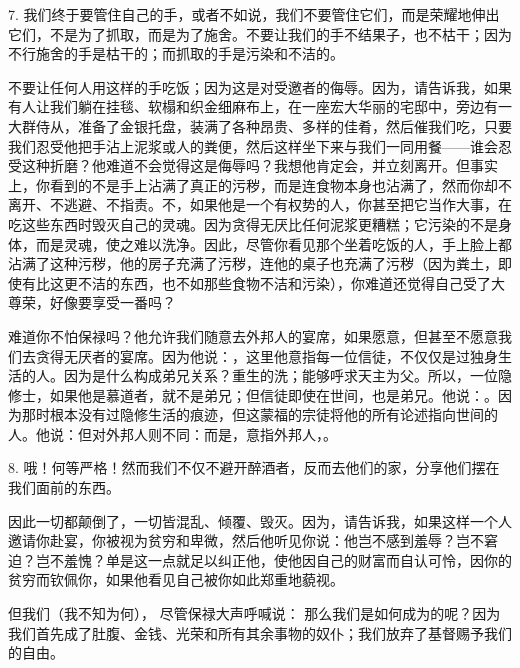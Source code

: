 7. 我们终于要管住自己的手，或者不如说，我们不要管住它们，而是荣耀地伸出它们，不是为了抓取，而是为了施舍。不要让我们的手不结果子，也不枯干；因为不行施舍的手是枯干的；而抓取的手是污染和不洁的。\par

不要让任何人用这样的手吃饭；因为这是对受邀者的侮辱。因为，请告诉我，如果有人让我们躺在挂毯、软榻和织金细麻布上，在一座宏大华丽的宅邸中，旁边有一大群侍从，准备了金银托盘，装满了各种昂贵、多样的佳肴，然后催我们吃，只要我们忍受他把手沾上泥浆或人的粪便，然后这样坐下来与我们一同用餐——谁会忍受这种折磨？他难道不会觉得这是侮辱吗？我想他肯定会，并立刻离开。但事实上，你看到的不是手上沾满了真正的污秽，而是连食物本身也沾满了，然而你却不离开、不逃避、不指责。不，如果他是一个有权势的人，你甚至把它当作大事，在吃这些东西时毁灭自己的灵魂。因为贪得无厌比任何泥浆更糟糕；它污染的不是身体，而是灵魂，使之难以洗净。因此，尽管你看见那个坐着吃饭的人，手上脸上都沾满了这种污秽，他的房子充满了污秽，连他的桌子也充满了污秽（因为粪土，即使有比这更不洁的东西，也不如那些食物不洁和污染），你难道还觉得自己受了大尊荣，好像要享受一番吗？\par

难道你不怕保禄吗？他允许我们随意去外邦人的宴席，如果愿意，但甚至不愿意我们去贪得无厌者的宴席。因为他说：，这里他意指每一位信徒，不仅仅是过独身生活的人。因为是什么构成弟兄关系？重生的洗；能够呼求天主为父。所以，一位隐修士，如果他是慕道者，就不是弟兄；但信徒即使在世间，也是弟兄。他说：。因为那时根本没有过隐修生活的痕迹，但这蒙福的宗徒将他的所有论述指向世间的人。他说：但对外邦人则不同：而是，意指外邦人，。\par

8. 哦！何等严格！然而我们不仅不避开醉酒者，反而去他们的家，分享他们摆在我们面前的东西。\par

因此一切都颠倒了，一切皆混乱、倾覆、毁灭。因为，请告诉我，如果这样一个人邀请你赴宴，你被视为贫穷和卑微，然后他听见你说：他岂不感到羞辱？岂不窘迫？岂不羞愧？单是这一点就足以纠正他，使他因自己的财富而自认可怜，因你的贫穷而钦佩你，如果他看见自己被你如此郑重地藐视。\par

但我们（我不知为何）， 尽管保禄大声呼喊说： 那么我们是如何成为的呢？因为我们首先成了肚腹、金钱、光荣和所有其余事物的奴仆；我们放弃了基督赐予我们的自由。\par

